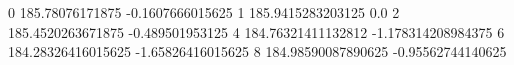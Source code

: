 0 185.78076171875 -0.1607666015625
1 185.9415283203125 0.0
2 185.4520263671875 -0.489501953125
4 184.76321411132812 -1.178314208984375
6 184.28326416015625 -1.65826416015625
8 184.98590087890625 -0.95562744140625
